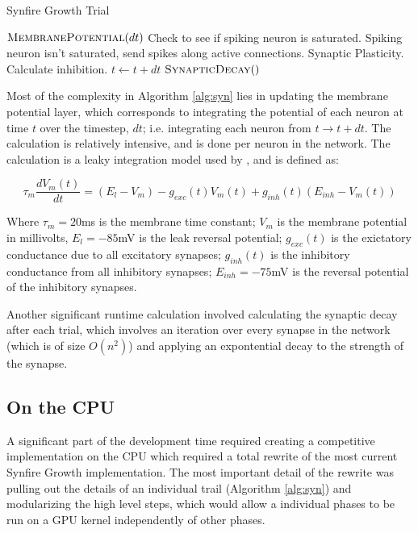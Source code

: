 \documentclass[a4paper]{article}
\begin{document}
\begin{algorithm}[H]
\caption{Synfire Growth Trial}
\label{alg:syn}
\begin{algorithmic}
	\State $\textsc{MembranePotential}(dt)$
		\State Check to see if spiking neuron is saturated.
		\State Spiking neuron isn't saturated, send spikes along active connections.
		\State Synaptic Plasticity.
	\EndFor
		\State Calculate inhibition.
	\EndFor
	\State $t \gets t + dt$
\EndWhile
\State $\textsc{SynapticDecay}()$
\end{algorithmic}
\end{algorithm}

Most of the complexity in Algorithm \ref{alg:syn} lies in updating the membrane potential layer, which corresponds to integrating the potential of each neuron at time $t$ over the timestep, $dt$; i.e. integrating each neuron from $t \rightarrow t + dt$. The calculation is relatively intensive, and is done per neuron in the network. The calculation is a leaky integration model used by \cite{synfire}, and is defined as:

$$\tau_m\frac{dV_m(t)}{dt} = (E_l - V_m) - g_{exc}(t)V_m(t)+g_{inh}(t)(E_{inh}-V_m(t))$$

Where $\tau_m = 20$ms is the membrane time constant; $V_m$ is the membrane potential in millivolts, $E_l = -85$mV is the leak reversal potential; $g_{exc}(t)$ is the exictatory conductance due to all excitatory synapses; $g_{inh}(t)$ is the inhibitory conductance from all inhibitory synapses; $E_{inh} = -75$mV is the reversal potential of the inhibitory synapses. 


Another significant runtime calculation involved calculating the synaptic decay after each trial, which involves an iteration over every synapse in the network (which is of size $O(n^2)$) and applying an expontential decay to the strength of the synapse.


\subsection{On the CPU}
A significant part of the development time required creating a competitive implementation on the CPU which required a total rewrite of the most current Synfire Growth implementation. The most important detail of the rewrite was pulling out the details of an individual trail (Algorithm \ref{alg:syn}) and modularizing the high level steps, which would allow a individual phases to be run on a GPU kernel independently of other phases.
\end{document}
